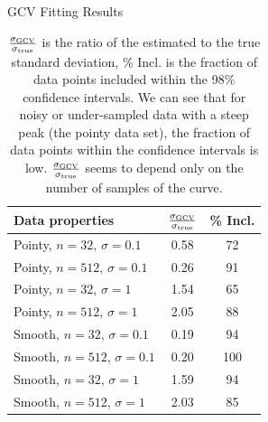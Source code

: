 \documentclass[11pt]{article}
\begin{document}
\begin{homeworkProblem}
    \begin{table}[H]

        \caption{GCV Fitting Results}

        \begin{center}
            \begin{tabular}{lcc}

            Data properties & $\frac{\sigma_{\rm GCV}}{\sigma_{\rm true}}$ & \%
            Incl.
            \\ \hline \hline
            Pointy, $n = 32$, $\sigma = 0.1$ & 0.58 & 72 \\
            Pointy, $n = 512$, $\sigma = 0.1$ & 0.26 & 91 \\
            Pointy, $n = 32$, $\sigma = 1$ & 1.54 & 65 \\
            Pointy, $n = 512$, $\sigma = 1$ & 2.05 & 88 \\
            Smooth, $n = 32$, $\sigma = 0.1$ & 0.19 & 94 \\
            Smooth, $n = 512$, $\sigma = 0.1$ & 0.20 & 100 \\
            Smooth, $n = 32$, $\sigma = 1$ & 1.59 & 94 \\
            Smooth, $n = 512$, $\sigma = 1$ & 2.03 & 85 \\
            \hline
            \end{tabular}

            \vspace{1cm}

            \caption{$\frac{\sigma_{\rm GCV}}{\sigma_{\rm true}}$ is the ratio
                of the estimated to the true standard deviation, \% Incl.  is
                the fraction of data points included within the 98\% confidence
                intervals. We can see that for noisy or under-sampled data with
                a steep peak (the pointy data set), the fraction of data points
                within the confidence intervals is low. $\frac{\sigma_{\rm
                GCV}}{\sigma_{\rm true}}$ seems to depend only on the number of
                samples of the curve.}

        \end{center}
    \end{table}

\end{homeworkProblem}
\end{document}
